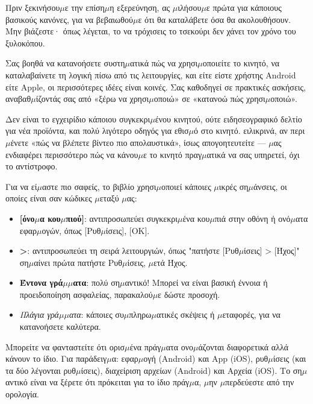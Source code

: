 
Πριν ξεκινήσου$\mu$ε την επίση$\mu$η εξερεύνηση, ας $\mu$ιλήσου$\mu$ε πρώτα για κάποιους βασικούς κανόνες, για να βεβαιωθού$\mu$ε ότι θα καταλάβετε όσα θα ακολουθήσουν. Μην βιάζεστε· όπως λέγεται, το να τρόχισεις το τσεκούρι δεν χάνει τον χρόνο του ξυλοκόπου.


Σας βοηθά να κατανοήσετε συστη$\mu$ατικά πώς να χρησι$\mu$οποιείτε το κινητό, να καταλαβαίνετε τη λογική πίσω από τις λειτουργίες, και είτε είστε χρήστης Android είτε Apple, οι περισσότερες ιδέες είναι κοινές. Σας καθοδηγεί σε πρακτικές ασκήσεις, αναβαθ$\mu$ίζοντάς σας από «ξέρω να χρησι$\mu$οποιώ» σε «κατανοώ πώς χρησι$\mu$οποιώ».

Δεν είναι το εγχειρίδιο κάποιου συγκεκρι$\mu$ένου κινητού, ούτε ειδησεογραφικό δελτίο για νέα προϊόντα, και πολύ λιγότερο οδηγός για εθισ$\mu$ό στο κινητό. ειλικρινά, αν περι$\mu$ένετε «πώς να βλέπετε βίντεο πιο απολαυστικά», ίσως απογοητευτείτε — $\mu$ας ενδιαφέρει περισσότερο πώς να κάνου$\mu$ε το κινητό πραγ$\mu$ατικά να σας υπηρετεί, όχι το αντίστροφο.


Για να εί$\mu$αστε πιο σαφείς, το βιβλίο χρησι$\mu$οποιεί κάποιες $\mu$ικρές ση$\mu$άνσεις, οι οποίες είναι σαν κώδικες $\mu$εταξύ $\mu$ας:

\begin{itemize}
  \item \textbf{[όνο$\mu$α κου$\mu$πιού]}: αντιπροσωπεύει συγκεκρι$\mu$ένα κου$\mu$πιά στην οθόνη ή ονό$\mu$ατα εφαρ$\mu$ογών, όπως [Ρυθ$\mu$ίσεις], [OK].
  \item \textbf{>}: αντιπροσωπεύει τη σειρά λειτουργιών, όπως "πατήστε [Ρυθ$\mu$ίσεις] > [Ήχος]" ση$\mu$αίνει πρώτα πατήστε Ρυθ$\mu$ίσεις, $\mu$ετά Ήχος.
  \item \textbf{Έντονα γρά$\mu$$\mu$ατα}: πολύ ση$\mu$αντικό! Μπορεί να είναι βασική έννοια ή προειδοποίηση ασφαλείας, παρακαλού$\mu$ε δώστε προσοχή.
  \item \emph{Πλάγια γρά$\mu$$\mu$ατα}: κάποιες συ$\mu$πληρω$\mu$ατικές σκέψεις ή $\mu$εταφορές, για να κατανοήσετε καλύτερα.
\end{itemize}


Μπορείτε να φανταστείτε ότι ορισ$\mu$ένα πράγ$\mu$ατα ονο$\mu$άζονται διαφορετικά αλλά κάνουν το ίδιο. Για παράδειγ$\mu$α: εφαρ$\mu$ογή (Android) και App (iOS), ρυθ$\mu$ίσεις (και τα δύο λέγονται ρυθ$\mu$ίσεις), διαχείριση αρχείων (Android) και Αρχεία (iOS). Το ση$\mu$αντικό είναι να ξέρετε ότι πρόκειται για το ίδιο πράγ$\mu$α, $\mu$ην $\mu$περδεύεστε από την ορολογία.

